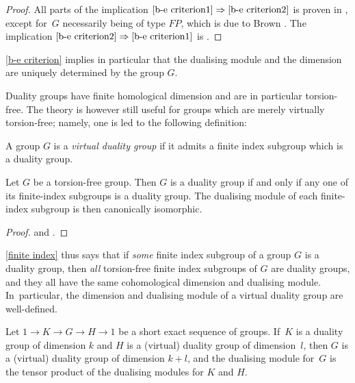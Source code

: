 \begin{proof}
All parts of the implication $\eqref{b-e criterion1}\Rightarrow\eqref{b-e criterion2}$ is proven in \cite[\S 1]{be}, except for~$G$ necessarily being of type $\mathit{FP}$, which is due to Brown \cite{brown-finiteness}. The implication $\eqref{b-e criterion2}\Rightarrow\eqref{b-e criterion1}$ is \cite[Th.\,4.5]{be}.
\end{proof}

\cref{b-e criterion} implies in particular that the dualising module and the dimension are uniquely determined by the group $G$.

Duality groups have finite homological dimension and are in particular torsion-free. The theory is however still useful for groups which are merely virtually torsion-free; namely, one is led to the following definition:

\begin{defn}
A group $G$ is a \emph{virtual duality group} if it admits a finite index subgroup which is a duality group.
\end{defn}

\begin{prop}\label{finite index}
Let $G$ be a torsion-free group. Then $G$ is a duality group if and only if any one of its finite-index subgroups is a duality group. The dualising module of each finite-index subgroup is then canonically isomorphic.
\end{prop}

\begin{proof}
\cite[Th.\,3.2]{be} and \cite[Th.\,3.3]{be}.
\end{proof}

\cref{finite index} thus says that if \emph{some} finite index subgroup of a group $G$ is a duality group, then \emph{all} torsion-free finite index subgroups of $G$ are duality groups, and they all have the same cohomological dimension and dualising module. In~particular, the dimension and dualising module of a virtual duality group are well-defined.

\Changel

\begin{prop}\label{prop:SES}
Let $1 \to K \to G \to H \to 1$ be a short exact sequence of groups. If~$K$ is a duality group of dimension $k$ and $H$ is a (virtual) duality group of dimension~$l$, then $G$ is a (virtual) duality group of dimension $k+l$, and the dualising module for~$G$ is the tensor product of the dualising modules for $K$ and $H$.
\end{prop}

